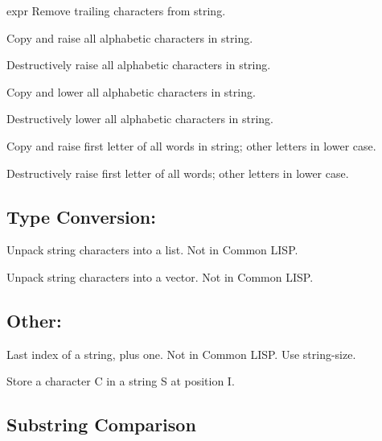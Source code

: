 {expr}
{    Remove trailing characters from string.
}

{    Copy and raise all alphabetic characters in string.
}

{    Destructively raise all alphabetic characters in string.
}

{    Copy and lower all alphabetic characters in string.
}

{    Destructively lower all alphabetic characters in string.
}

{    Copy and raise first letter of all words  in  string;  other
    letters in lower case.
}

{    Destructively raise first letter of all words; other letters
    in lower case.
}\\

\subsection{Type Conversion:}

{    Unpack string characters into a list.  Not in Common LISP.
}

{    Unpack string characters into a vector.  Not in Common LISP.
}\\

\subsection{Other:}

{    Last  index of a string, plus one.  Not in Common LISP.  Use
    string-size.
}

{    Store a character C in a string S at position I.
}

\subsection{Substring Comparison}

